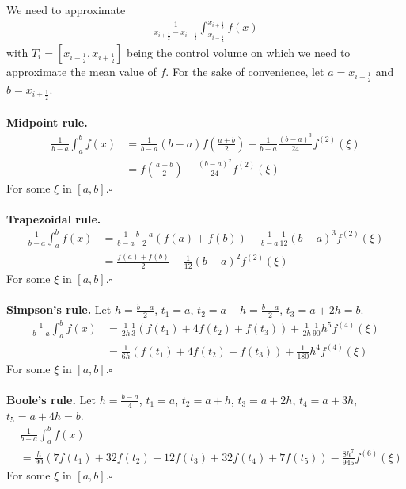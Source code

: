\documentclass[a4paper]{article}
\numberwithin{equation}{section}
\begin{document}
We need to approximate 
\begin{align}
\frac{1}{x_{i+\frac{1}{2}}-x_{i-\frac{1}{2}}}\int_{x_{i-\frac{1}{2}}}^{x_{i+\frac{1}{2}}}f(x)
\end{align}
with $T_i=\left[x_{i-\frac{1}{2}},x_{i+\frac{1}{2}}\right]$ being the control volume on which we need to approximate the mean value of $f$. For the sake of convenience, let $a=x_{i-\frac{1}{2}}$ and $b=x_{i+\frac{1}{2}}$.\\
\\
\textbf{Midpoint rule.}
\begin{align}
\frac{1}{b-a}\int_{a}^{b}f(x)&=\frac{1}{b-a}(b-a)f\left(\frac{a+b}{2}\right)-\frac{1}{b-a}\frac{(b-a)^3}{24}f^{(2)}(\xi)\\
		&=f\left(\frac{a+b}{2}\right)-\frac{(b-a)^2}{24}f^{(2)}(\xi)
\end{align}
For some $\xi$ in $[a,b]$.\hfill $\square$\\
\\
\textbf{Trapezoidal rule.}
\begin{align}
\frac{1}{b-a}\int_{a}^{b}f(x)&=\frac{1}{b-a}\frac{b-a}{2}(f(a)+f(b))-\frac{1}{b-a}\frac{1}{12}(b-a)^3f^{(2)}(\xi)\\
	&=\frac{f(a)+f(b)}{2}-\frac{1}{12}(b-a)^2f^{(2)}(\xi)
\end{align}
For some $\xi$ in $[a,b]$.\hfill $\square$\\
\\
\textbf{Simpson's rule.} Let $h=\frac{b-a}{2}$, $t_1=a$, $t_2=a+h=\frac{b-a}{2}$, $t_3=a+2h=b$.
\begin{align}
\frac{1}{b-a}\int_{a}^{b}f(x)&=\frac{1}{2h}\frac{1}{3}\left(f(t_1)+4f(t_2)+f(t_3)\right)+\frac{1}{2h}\frac{1}{90}h^5f^{(4)}(\xi)\\
	&=\frac{1}{6h}\left(f(t_1)+4f(t_2)+f(t_3)\right)+\frac{1}{180}h^4f^{(4)}(\xi)
\end{align}
For some $\xi$ in $[a,b]$.\hfill $\square$\\
\\
\textbf{Boole's rule.} Let $h=\frac{b-a}{4}$, $t_1=a$, $t_2=a+h$, $t_3=a+2h$, $t_4=a+3h$, $t_5=a+4h=b$.
\begin{align}
&\frac{1}{b-a}\int_{a}^{b}f(x)\\
&=\frac{h}{90}\left(7f(t_1)+32f(t_2)+12f(t_3)+32f(t_4)+7f(t_5)\right)-\frac{8h^7}{945}f^{(6)}(\xi)&
\end{align}
For some $\xi$ in $[a,b]$.\hfill $\square$\\
\end{document}
